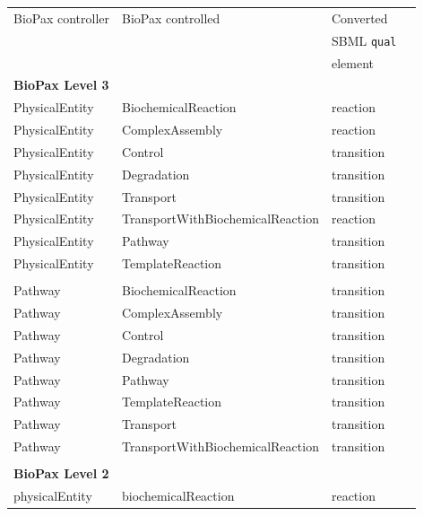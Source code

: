 \documentclass{bioinfo}
\newcommand{\qual}{\texttt{qual}}
\begin{document}
\begin{methods}
\begin{table}[t!h]
{\begin{tabular}{llll}\toprule
BioPax controller & BioPax controlled               & Converted\\
                  &                                 & SBML \qual\\
                  &                                 & element\\
\midrule
\textbf{BioPax Level 3}\\
\midrule
PhysicalEntity & BiochemicalReaction                & reaction\\
PhysicalEntity & ComplexAssembly                    & reaction\\
PhysicalEntity & Control                            & transition\\
PhysicalEntity & Degradation                        & transition\\
PhysicalEntity & Transport                          & transition\\
PhysicalEntity & TransportWithBiochemicalReaction   & reaction\\
PhysicalEntity & Pathway                            & transition\\
PhysicalEntity & TemplateReaction                   & transition\\
\\
Pathway         & BiochemicalReaction               & transition\\
Pathway         & ComplexAssembly                   & transition\\
Pathway         & Control                           & transition\\
Pathway         & Degradation                       & transition\\
Pathway         & Pathway                           & transition\\
Pathway         & TemplateReaction                  & transition\\
Pathway         & Transport                         & transition\\
Pathway         & TransportWithBiochemicalReaction  & transition\\
\\\midrule
\textbf{BioPax Level 2}\\
\midrule
physicalEntity & biochemicalReaction                & reaction\\

\end{tabular}}
\end{table}
\end{methods}
\end{document}
